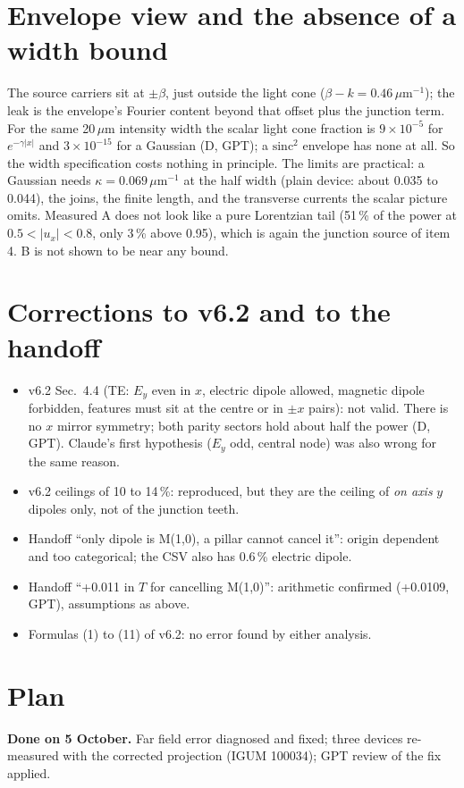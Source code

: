 \documentclass[11pt,a4paper]{article}
\begin{document}
\section{Envelope view and the absence of a width bound}\label{sec:env}
The source carriers sit at $\pm\beta$, just outside the light cone ($\beta-k=0.46$\,$\mu$m$^{-1}$); the leak is
the envelope's Fourier content beyond that offset plus the junction term. For the same 20\,$\mu$m intensity width
the scalar light cone fraction is $9\times10^{-5}$ for $e^{-\gamma|x|}$ and $3\times10^{-15}$ for a Gaussian (D,
GPT); a $\mathrm{sinc}^2$ envelope has none at all. So the width specification costs nothing in principle. The
limits are practical: a Gaussian needs $\kappa=0.069$\,$\mu$m$^{-1}$ at the half width (plain device: about
0.035 to 0.044), the joins, the finite length, and the transverse currents the scalar picture omits. Measured A
does not look like a pure Lorentzian tail (51\,\% of the power at $0.5<|u_x|<0.8$, only 3\,\% above 0.95), which
is again the junction source of item 4. B is not shown to be near any bound.

\section{Corrections to v6.2 and to the handoff}
\begin{itemize}
\item v6.2 Sec.~4.4 (TE: $E_y$ even in $x$, electric dipole allowed, magnetic dipole forbidden, features must sit
at the centre or in $\pm x$ pairs): not valid. There is no $x$ mirror symmetry; both parity sectors hold about half
the power (D, GPT). Claude's first hypothesis ($E_y$ odd, central node) was also wrong for the same reason.
\item v6.2 ceilings of 10 to 14\,\%: reproduced, but they are the ceiling of \emph{on axis} $y$ dipoles only,
not of the junction teeth.
\item Handoff ``only dipole is M(1,0), a pillar cannot cancel it'': origin dependent and too categorical; the CSV
also has 0.6\,\% electric dipole.
\item Handoff ``+0.011 in $T$ for cancelling M(1,0)'': arithmetic confirmed (+0.0109, GPT), assumptions as above.
\item Formulas (1) to (11) of v6.2: no error found by either analysis.
\end{itemize}

\section{Plan}
\textbf{Done on 5 October.} Far field error diagnosed and fixed; three devices re-measured with the corrected
projection (IGUM 100034); GPT review of the fix applied.
\end{document}
